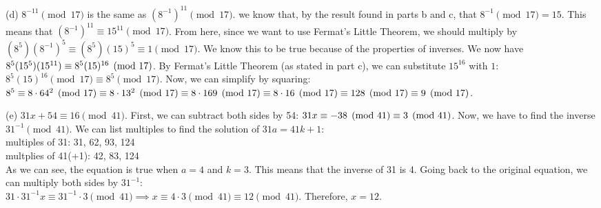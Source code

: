 \documentclass[11pt]{article}
\begin{document}
\begin{solution}
    \pagebreak
    \medskip\noindent
    (d) $8^{-11}\pmod{17}$ is the same 
        as $(8^{-1})^{11}\pmod{17}$.
        we know that, by the result 
        found in parts b and c,
        that $8^{-1}\pmod{17} = 15$.
        This means that
        $(8^{-1})^{11}
        \equiv 15^{11} \pmod{17}$. 
        From here, since we want to use Fermat's 
        Little Theorem, we should multiply by 
        $(8^5)(8^{-1})^{5} \equiv (8^5)(15)^{5} 
        \equiv 1\pmod{17}$.
        We know this to be true because of the properties
        of inverses. We now have
        $8^5(15^5)(15^{11})
        \\\equiv 8^5(15)^{16}\pmod{17}$. By Fermat's 
        Little Theorem (as stated in part c),
        we can substitute $15^{16}$ with $1$: 
        $8^5(15)^{16}\pmod{17} 
        \equiv 8^5\pmod{17}$. Now, we can simplify
        by squaring:
        \\ $8^5 \equiv 8 \cdot 64^2\pmod{17}
        \\ \equiv 8 \cdot 13^2\pmod{17}
        \\ \equiv 8 \cdot 169\pmod{17}
        \\ \equiv 8 \cdot 16\pmod{17}
        \\ \equiv 128\pmod{17}
        \\ \equiv 9\pmod{17}
        $.

        \medskip\noindent
        (e) $31x+54\equiv16\pmod{41}$. 
        First, we can subtract both sides 
        by 54: $31x\equiv-38\pmod{41}
        \\\equiv3\pmod{41}$. Now, we have to find
        the inverse $31^{-1}\pmod{41}$. We can list
        multiples to find the solution of
        $31a = 41k + 1$: 
        \\ multiples of 31: 31, 62, 93, 124
        \\ multplies of 41(+1): 42, 83, 124
        \\ As we can see, the equation is true 
        when $a=4$ and $k=3$. This means that the
        inverse of 31 is 4. Going back to the 
        original equation, we can multiply
        both sides by $31^{-1}$: 
        \\ $31 \cdot 31^{-1}x 
        \equiv 31^{-1}\cdot 3\pmod{41}
        \implies x \equiv 4 \cdot 3 \pmod{41}
        \equiv 12 \pmod{41}
        $. Therefore, $x=12$.


    
    
    
\end{solution}
\end{document}
